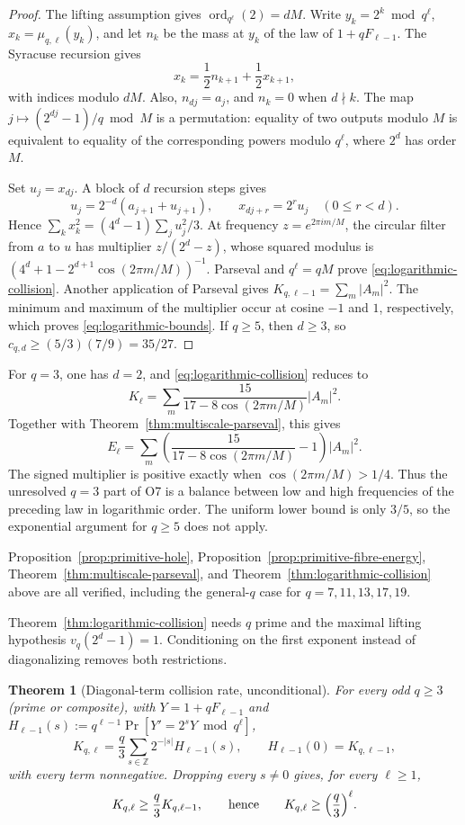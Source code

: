 \documentclass[11pt]{article}
\newtheorem{theorem}{Theorem}[section]
\theoremstyle{definition}
\theoremstyle{remark}
\DeclareMathOperator{\ord}{ord}
\begin{document}
\begin{proof}
The lifting assumption gives $\ord_{q^\ell}(2)=dM$. Write
$y_k=2^k\bmod q^\ell$, $x_k=\mu_{q,\ell}(y_k)$, and let
$n_k$ be the mass at $y_k$ of the law of $1+qF_{\ell-1}$. The Syracuse
recursion gives
\[
 x_k=\frac12 n_{k+1}+\frac12x_{k+1},
\]
with indices modulo $dM$. Also, $n_{dj}=a_j$, and $n_k=0$ when
$d\nmid k$. The map $j\mapsto(2^{dj}-1)/q\bmod M$ is a permutation:
equality of two outputs modulo $M$ is equivalent to equality of the
corresponding powers modulo $q^\ell$, where $2^d$ has order $M$.

Set $u_j=x_{dj}$. A block of $d$ recursion steps gives
\[
 u_j=2^{-d}(a_{j+1}+u_{j+1}),\qquad
 x_{dj+r}=2^r u_j\quad(0\le r<d).
\]
Hence $\sum_kx_k^2=(4^d-1)\sum_ju_j^2/3$. At frequency
$z=e^{2\pi i m/M}$, the circular filter from $a$ to $u$ has multiplier
$z/(2^d-z)$, whose squared modulus is
$(4^d+1-2^{d+1}\cos(2\pi m/M))^{-1}$. Parseval and $q^\ell=qM$ prove
\eqref{eq:logarithmic-collision}. Another application of Parseval gives
$K_{q,\ell-1}=\sum_m|A_m|^2$. The minimum and maximum of the multiplier
occur at cosine $-1$ and $1$, respectively, which proves
\eqref{eq:logarithmic-bounds}. If $q\ge5$, then $d\ge3$, so
$c_{q,d}\ge(5/3)(7/9)=35/27$.
\end{proof}

For $q=3$, one has $d=2$, and \eqref{eq:logarithmic-collision} reduces
to
\[
 K_\ell=\sum_m\frac{15}{17-8\cos(2\pi m/M)}|A_m|^2.
\]
Together with Theorem~\ref{thm:multiscale-parseval}, this gives
\[
 E_\ell=\sum_m
 \left(\frac{15}{17-8\cos(2\pi m/M)}-1\right)|A_m|^2.
\]
The signed multiplier is positive exactly when
$\cos(2\pi m/M)>1/4$. Thus the unresolved $q=3$ part of O7 is a
balance between low and high frequencies of the preceding law in
logarithmic order. The uniform lower bound is only $3/5$, so the
exponential argument for $q\ge5$ does not apply.

Proposition~\ref{prop:primitive-hole},
Proposition~\ref{prop:primitive-fibre-energy},
Theorem~\ref{thm:multiscale-parseval}, and
Theorem~\ref{thm:logarithmic-collision} above are all verified,
including the general-$q$ case for $q=7,11,13,17,19$.

Theorem~\ref{thm:logarithmic-collision} needs $q$ prime and the maximal
lifting hypothesis $v_q(2^d-1)=1$. Conditioning on the first exponent
instead of diagonalizing removes both restrictions.

\begin{theorem}[Diagonal-term collision rate, unconditional]
\label{thm:diagonal-collision}
For every odd $q\ge3$ (prime or composite), with $Y=1+qF_{\ell-1}$ and
$H_{\ell-1}(s):=q^{\ell-1}\Pr[Y'=2^sY\bmod q^\ell]$,
\[
 K_{q,\ell}=\frac q3\sum_{s\in\mathbb Z}2^{-|s|}H_{\ell-1}(s),
 \qquad H_{\ell-1}(0)=K_{q,\ell-1},
\]
with every term nonnegative. Dropping every $s\ne0$ gives, for every
$\ell\ge1$,
\begin{equation}\label{eq:diagonal-rate}
 K_{q,\ell}\ge\frac q3K_{q,\ell-1},
 \qquad\text{hence}\qquad
 K_{q,\ell}\ge\Bigl(\frac q3\Bigr)^\ell.
\end{equation}
\end{theorem}
\end{document}
